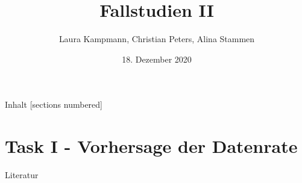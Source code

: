\documentclass[10pt]{beamer}
\title{Fallstudien II}
\date{18. Dezember 2020}
\author{Laura Kampmann, Christian Peters, Alina Stammen}
\begin{document}
\maketitle

\begin{frame}{Inhalt}
  [sections numbered]
  \tableofcontents
\end{frame}

%

%

\section{Task I - Vorhersage der Datenrate}














\appendix

\begin{frame}[allowframebreaks]{Literatur}

  \nocite{XGBoost}

  
  

\end{frame}


%
\end{document}
